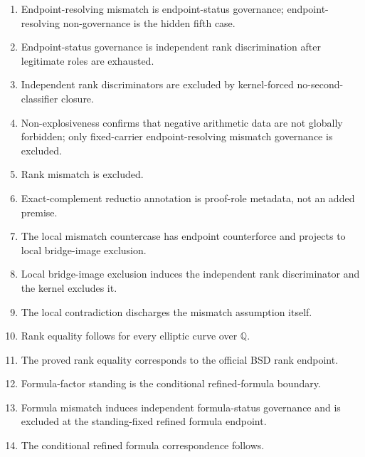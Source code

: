 \documentclass[11pt]{article}
\newcommand{\Q}{\mathbb{Q}}
\begin{document}
\begin{enumerate}
\item Endpoint-resolving mismatch is endpoint-status governance; endpoint-resolving non-governance is the hidden fifth case.
\item Endpoint-status governance is independent rank discrimination after legitimate roles are exhausted.
\item Independent rank discriminators are excluded by kernel-forced no-second-classifier closure.
\item Non-explosiveness confirms that negative arithmetic data are not globally forbidden; only fixed-carrier endpoint-resolving mismatch governance is excluded.
\item Rank mismatch is excluded.
\item Exact-complement reductio annotation is proof-role metadata, not an added premise.
\item The local mismatch countercase has endpoint counterforce and projects to local bridge-image exclusion.
\item Local bridge-image exclusion induces the independent rank discriminator and the kernel excludes it.
\item The local contradiction discharges the mismatch assumption itself.
\item Rank equality follows for every elliptic curve over $\Q$.
\item The proved rank equality corresponds to the official BSD rank endpoint.
\item Formula-factor standing is the conditional refined-formula boundary.
\item Formula mismatch induces independent formula-status governance and is excluded at the standing-fixed refined formula endpoint.
\item The conditional refined formula correspondence follows.
\end{enumerate}
\end{document}

